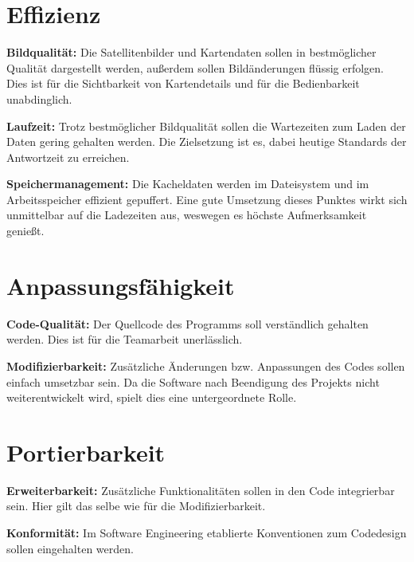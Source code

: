 \documentclass[10pt]{scrreprt}
\newcommand{\sfbf}[1]{\textbf{\sffamily #1}}
\newenvironment{details}[1][6pt]{%
  \parskip#1 \parindent6mm \raggedright%
  \def\item{\par\ignorespaces\hangindent=5mm \hangafter1}}{%
  \par\ignorespaces}
\begin{document}
\section*{Effizienz}
\begin{details}
\item \sfbf{Bildqualität:} Die Satellitenbilder und Kartendaten sollen in bestmöglicher Qualität dargestellt werden, außerdem sollen Bildänderungen flüssig erfolgen. Dies ist für die Sichtbarkeit von Kartendetails und für die Bedienbarkeit unabdinglich.

\item \sfbf{Laufzeit:} Trotz bestmöglicher Bildqualität sollen die Wartezeiten zum Laden der Daten gering gehalten werden. Die Zielsetzung ist es, dabei heutige Standards der Antwortzeit zu erreichen.

\item \sfbf{Speichermanagement:} Die Kacheldaten werden im Dateisystem und im Arbeitsspeicher effizient gepuffert. Eine gute Umsetzung dieses Punktes wirkt sich unmittelbar auf die Ladezeiten aus, weswegen es höchste Aufmerksamkeit genießt.
\end{details}


\section*{Anpassungsfähigkeit}
\begin{details}
\item \sfbf{Code-Qualität:} Der Quellcode des Programms soll verständlich gehalten werden. Dies ist für die Teamarbeit unerlässlich.

\item \sfbf{Modifizierbarkeit:} Zusätzliche Änderungen bzw. Anpassungen des Codes sollen einfach umsetzbar sein. Da die Software nach Beendigung des Projekts nicht weiterentwickelt wird, spielt dies eine untergeordnete Rolle.
\end{details}


\section*{Portierbarkeit}
\begin{details}
\item \sfbf{Erweiterbarkeit:} Zusätzliche Funktionalitäten sollen in den Code integrierbar sein. Hier gilt das selbe wie für die Modifizierbarkeit.

\item \sfbf{Konformität:} Im Software Engineering etablierte Konventionen zum Codedesign sollen eingehalten werden.
\end{details}
\end{document}
